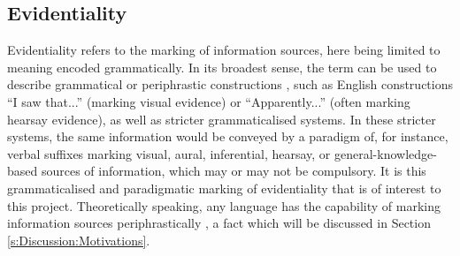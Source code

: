 \subsection{Evidentiality}\label{s:Intro:EvidentialityIntro}
Evidentiality refers to the marking of information sources, here being limited to meaning encoded grammatically. In its broadest sense, the term can be used to describe grammatical or periphrastic constructions \cite{SanRoque2019Evidentiality}, such as English constructions ``I saw that...'' (marking visual evidence) or ``Apparently...'' (often marking hearsay evidence), as well as stricter grammaticalised systems. In these stricter systems, the same information would be conveyed by a paradigm of, for instance, verbal suffixes marking visual, aural, inferential, hearsay, or general-knowledge-based sources of information, which may or may not be compulsory. It is this grammaticalised and paradigmatic marking of evidentiality that is of interest to this project. Theoretically speaking, any language has the capability of marking information sources periphrastically \cite{SanRoque2019Evidentiality}, a fact which will be discussed in Section \ref{s:Discussion:Motivations}.

